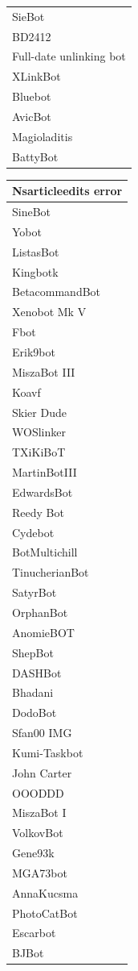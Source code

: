 \documentclass{article}
\begin{document}
\begin{landscape}
\begin{table}
\begin{center}
\begin{tabular}{l}
SieBot \\
BD2412 \\
Full-date unlinking bot \\
XLinkBot \\
Bluebot \\
AvicBot \\
Magioladitis \\
BattyBot \\
\end{tabular}
\begin{tabular}{l}
\hline
Nsarticleedits error \\
\hline 
SineBot \\
Yobot \\
ListasBot \\
Kingbotk \\
BetacommandBot \\
Xenobot Mk V \\
Fbot \\
Erik9bot \\
MiszaBot III \\
Koavf \\
Skier Dude \\
WOSlinker \\
TXiKiBoT \\
MartinBotIII \\
EdwardsBot \\
Reedy Bot \\
Cydebot \\
BotMultichill \\
TinucherianBot \\
SatyrBot \\
OrphanBot \\
AnomieBOT \\
ShepBot \\
DASHBot \\
Bhadani \\
DodoBot \\
Sfan00 IMG \\
Kumi-Taskbot \\
John Carter \\
OOODDD \\
MiszaBot I \\
VolkovBot \\
Gene93k \\
MGA73bot \\
AnnaKucsma \\
PhotoCatBot \\
Escarbot \\
BJBot \\

\end{tabular}
\end{center}
\end{table}
\end{landscape}
\end{document}
